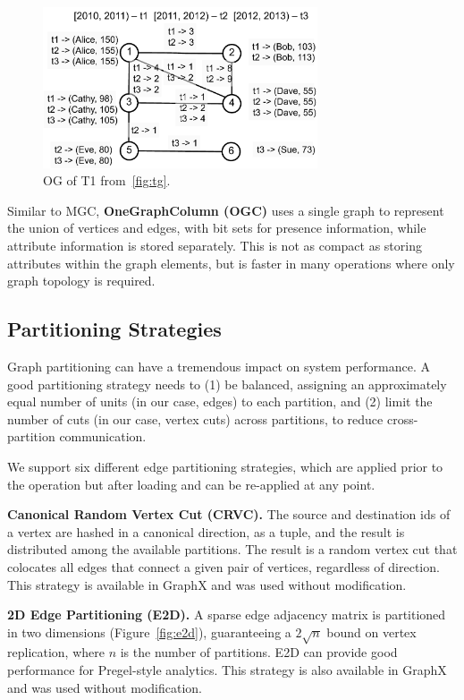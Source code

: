 \begin{figure}[t!]
\includegraphics[width=3.2in]{figs/og.pdf}
\caption{OG of T1 from~\ref{fig:tg}.}
\label{fig:og}
\end{figure}

Similar to MGC, {\bf OneGraphColumn (OGC)} uses a single graph to
represent the union of vertices and edges, with bit sets for presence
information, while attribute information is stored separately.  This
is not as compact as storing attributes within the graph elements, but
is faster in many operations where only graph topology is required.

\subsection{Partitioning Strategies}  
\label{sec:sys:partition}

Graph partitioning can have a tremendous impact on system performance.
A good partitioning strategy needs to (1) be balanced, assigning an
approximately equal number of units (in our case, edges) to each
partition, and (2) limit the number of cuts (in our case, vertex cuts)
across partitions, to reduce cross-partition communication.

We support six different edge partitioning strategies, which are
applied prior to the operation but after loading and can be re-applied
at any point.

{\bf Canonical Random Vertex Cut (CRVC).}  The source and destination
ids of a vertex are hashed in a canonical direction, as a tuple, and
the result is distributed among the available partitions.  The result
is a random vertex cut that colocates all edges that connect a given
pair of vertices, regardless of direction.  This strategy is available
in GraphX and was used without modification.

{\bf 2D Edge Partitioning (E2D).}  A sparse edge adjacency matrix is
partitioned in two dimensions (Figure~\ref{fig:e2d}), guaranteeing a
$2 \sqrt{n}$ bound on vertex replication, where $n$ is the number of
partitions. E2D can provide good performance for Pregel-style
analytics.  This strategy is also available in GraphX and was used
without modification.

